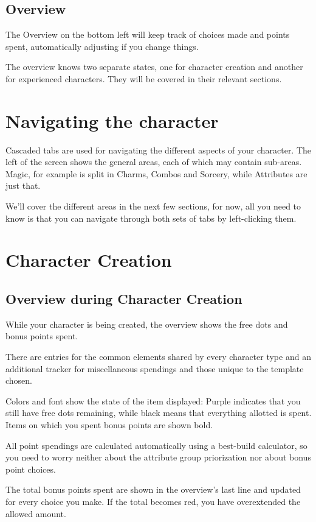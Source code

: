 \subsection{Overview}
The Overview on the bottom left will keep track of choices made and points spent, automatically adjusting if you change things. 

The overview knows two separate states, one for character creation and another for experienced characters. They will be covered in their relevant sections.

\section{Navigating the character}
Cascaded tabs are used for navigating the different aspects of your character. The left of the screen shows the general areas, each of which may contain sub-areas. Magic, for example is split in Charms, Combos and Sorcery, while Attributes are just that.

We'll cover the different areas in the next few sections, for now, all you need to know is that you can navigate through both sets of tabs by left-clicking them.

\section{Character Creation}

\subsection{Overview during Character Creation}
While your character is being created, the overview shows the free dots and bonus points spent.

There are entries for the common elements shared by every character type and an additional tracker for miscellaneous spendings and those unique to the template chosen.

Colors and font show the state of the item displayed: Purple indicates that you still have free dots remaining, 
while black means that everything allotted is spent. Items on which you spent bonus points are shown bold. 

All point spendings are calculated automatically using a best-build calculator, so you need to worry neither about the attribute group priorization nor about bonus point choices.

The total bonus points spent are shown in the overview's last line and updated for every choice you make. If the total becomes red, you have overextended the allowed amount.

